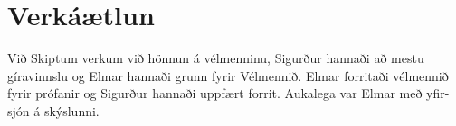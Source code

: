 \section{Verkáætlun}
Við Skiptum verkum við hönnun á vélmenninu, Sigurður hannaði að mestu gíravinnslu og Elmar hannaði grunn fyrir Vélmennið. Elmar forritaði vélmennið fyrir prófanir og Sigurður hannaði uppfært forrit. Aukalega var Elmar með yfir-sjón á skýslunni.